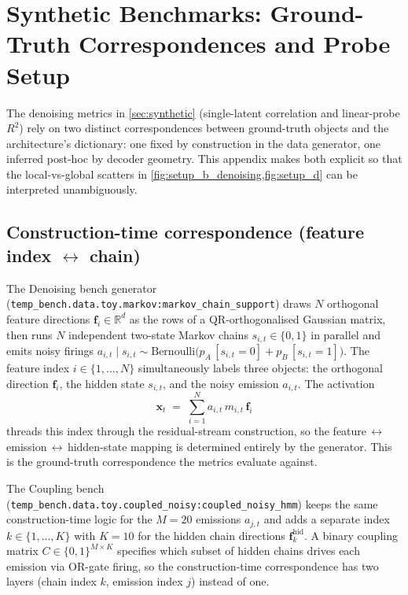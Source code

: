 \section{Synthetic Benchmarks: Ground-Truth Correspondences and Probe Setup}
\label{app:synthetic-probes}

The denoising metrics in \cref{sec:synthetic} (single-latent correlation and linear-probe $R^2$) rely on two distinct correspondences between ground-truth objects and the architecture's dictionary: one fixed by construction in the data generator, one inferred post-hoc by decoder geometry. This appendix makes both explicit so that the local-vs-global scatters in \cref{fig:setup_b_denoising,fig:setup_d} can be interpreted unambiguously.

\subsection{Construction-time correspondence (feature index $\leftrightarrow$ chain)}
\label{app:synthetic-construction}

The Denoising bench generator (\texttt{temp\_bench.data.toy.markov:markov\_chain\_support}) draws $N$ orthogonal feature directions $\mathbf{f}_i \in \mathbb{R}^d$ as the rows of a QR-orthogonalised Gaussian matrix, then runs $N$ independent two-state Markov chains $s_{i,t} \in \{0,1\}$ in parallel and emits noisy firings $a_{i,t}\mid s_{i,t}\sim\mathrm{Bernoulli}\!\big(p_A\,[s_{i,t}{=}0] + p_B\,[s_{i,t}{=}1]\big)$. The feature index $i \in \{1,\ldots,N\}$ simultaneously labels three objects: the orthogonal direction $\mathbf{f}_i$, the hidden state $s_{i,t}$, and the noisy emission $a_{i,t}$. The activation
\[
    \mathbf{x}_t \;=\; \sum_{i=1}^N a_{i,t}\, m_{i,t}\, \mathbf{f}_i
\]
threads this index through the residual-stream construction, so the feature$\,\leftrightarrow\,$emission$\,\leftrightarrow\,$hidden-state mapping is determined entirely by the generator. This is the ground-truth correspondence the metrics evaluate against.

The Coupling bench (\texttt{temp\_bench.data.toy.coupled\_noisy:coupled\_noisy\_hmm}) keeps the same construction-time logic for the $M = 20$ emissions $a_{j,t}$ and adds a separate index $k \in \{1,\ldots,K\}$ with $K = 10$ for the hidden chain directions $\mathbf{f}^{\mathrm{hid}}_k$. A binary coupling matrix $C \in \{0,1\}^{M \times K}$ specifies which subset of hidden chains drives each emission via OR-gate firing, so the construction-time correspondence has two layers (chain index $k$, emission index $j$) instead of one.

